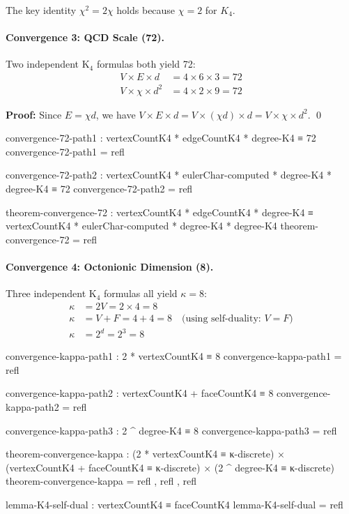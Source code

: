 \documentclass[11pt,a4paper]{book}
\begin{document}
The key identity $\chi^2 = 2\chi$ holds because $\chi = 2$ for $K_4$.

\paragraph{Convergence 3: QCD Scale (72).}

Two independent K$_4$ formulas both yield 72:
\begin{align}
V \times E \times d &= 4 \times 6 \times 3 = 72 \\
V \times \chi \times d^2 &= 4 \times 2 \times 9 = 72
\end{align}

\textbf{Proof:} Since $E = \chi d$, we have $V \times E \times d = V \times (\chi d) \times d = V \times \chi \times d^2$. \qed

\begin{code}
convergence-72-path1 : vertexCountK4 * edgeCountK4 * degree-K4 ≡ 72
convergence-72-path1 = refl

convergence-72-path2 : vertexCountK4 * eulerChar-computed * degree-K4 * degree-K4 ≡ 72
convergence-72-path2 = refl

theorem-convergence-72 : vertexCountK4 * edgeCountK4 * degree-K4 
                       ≡ vertexCountK4 * eulerChar-computed * degree-K4 * degree-K4
theorem-convergence-72 = refl
\end{code}

\paragraph{Convergence 4: Octonionic Dimension (8).}

Three independent K$_4$ formulas all yield $\kappa = 8$:
\begin{align}
\kappa &= 2V = 2 \times 4 = 8 \\
\kappa &= V + F = 4 + 4 = 8 \quad \text{(using self-duality: } V = F \text{)} \\
\kappa &= 2^d = 2^3 = 8
\end{align}

\begin{code}
convergence-kappa-path1 : 2 * vertexCountK4 ≡ 8
convergence-kappa-path1 = refl

convergence-kappa-path2 : vertexCountK4 + faceCountK4 ≡ 8
convergence-kappa-path2 = refl

convergence-kappa-path3 : 2 ^ degree-K4 ≡ 8
convergence-kappa-path3 = refl

theorem-convergence-kappa : (2 * vertexCountK4 ≡ κ-discrete) × 
                            (vertexCountK4 + faceCountK4 ≡ κ-discrete) ×
                            (2 ^ degree-K4 ≡ κ-discrete)
theorem-convergence-kappa = refl , refl , refl

lemma-K4-self-dual : vertexCountK4 ≡ faceCountK4
lemma-K4-self-dual = refl
\end{code}
\end{document}
